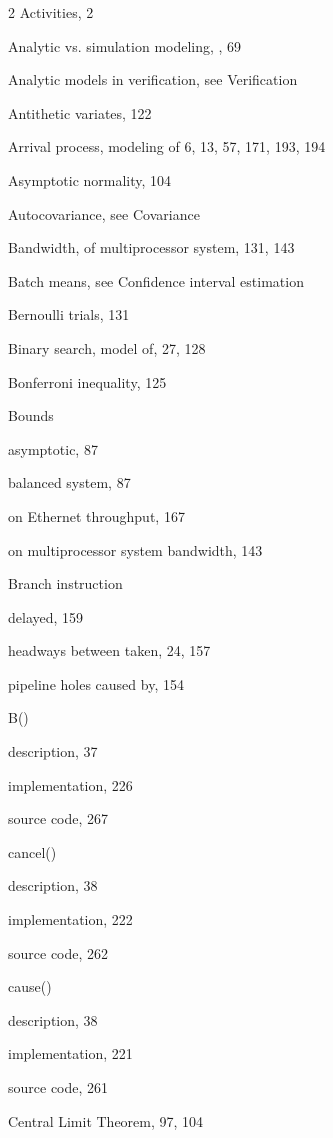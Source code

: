 \begin{multicols}{2}
\ManualSubjectIndex
\noindent Activities, 2\par
\noindent Analytic vs. simulation modeling, , 69\par
\noindent Analytic models in verification, see Verification\par
\noindent Antithetic variates, 122\par
\noindent Arrival process, modeling of 6, 13, 57, 171, 193, 194\par
\noindent Asymptotic normality, 104\par
\noindent Autocovariance, see Covariance\par
\noindent Bandwidth, of multiprocessor system, 131, 143\par
\noindent Batch means, see Confidence interval estimation\par
\noindent Bernoulli trials, 131\par
\noindent Binary search, model of, 27, 128\par
\noindent Bonferroni inequality, 125\par
\noindent Bounds\par
\quad asymptotic, 87\par
\quad balanced system, 87\par
\quad on Ethernet throughput, 167\par
\quad on multiprocessor system bandwidth, 143\par
\noindent Branch instruction\par
\quad delayed, 159\par
\quad headways between taken, 24, 157\par
\quad pipeline holes caused by, 154\par
\noindent B()\par
\quad description, 37\par
\quad implementation, 226\par
\quad source code, 267\par
\noindent cancel()\par
\quad description, 38\par
\quad implementation, 222\par
\quad source code, 262\par
\noindent cause()\par
\quad description, 38\par
\quad implementation, 221\par
\quad source code, 261\par
\noindent Central Limit Theorem, 97, 104\par

\end{multicols}
